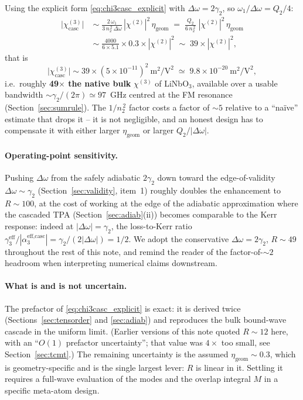 \documentclass[11pt,a4paper]{article}
\newcommand{\chitwo}{\chi^{(2)}}
\newcommand{\chithree}{\chi^{(3)}}
\newcommand{\Dom}{\Delta\omega}
\begin{document}
Using the explicit form \eqref{eq:chi3casc_explicit} with $\Dom=2\gamma_2$,
so $\omega_1/\Dom = Q_2/4$:
\begin{align*}
  \bigl|\chithree_\text{casc}\bigr|\;&\sim\;
        \frac{2\,\omega_1}{3\,n_2^{\,2}\,\Dom}\,|\chitwo|^{2}\,\eta_\text{geom}
   \;=\;\frac{Q_2}{6\,n_2^{\,2}}\;|\chitwo|^{2}\,\eta_\text{geom}\\[2pt]
   &\sim\;\frac{4000}{6\times 5.1}\times 0.3\times|\chitwo|^{2}
   \;\sim\;39\times|\chitwo|^{2},
\end{align*}
that is
\begin{equation*}
  \bigl|\chithree_\text{casc}\bigr|\sim
       39\times(5\times10^{-11})^{2}\ \mathrm{m^{2}/V^{2}}
       \;\simeq\;9.8\times10^{-20}\ \mathrm{m^{2}/V^{2}},
\end{equation*}
i.e.\ roughly \textbf{49$\boldsymbol{\times}$ the native bulk}
$\chithree$ of LiNbO$_3$, available over a usable bandwidth
$\sim\gamma_2/(2\pi)\simeq 97$~GHz centred at the FM resonance
(Section~\ref{sec:sumrule}).  The $1/n_2^{\,2}$ factor costs a factor
of $\sim 5$ relative to a ``naïve'' estimate that drops it -- it is
not negligible, and an honest design has to compensate it with either
larger $\eta_\text{geom}$ or larger $Q_2/|\Dom|$.

\paragraph{Operating-point sensitivity.}
Pushing $\Dom$ from the safely adiabatic $2\gamma_2$ down toward the
edge-of-validity $\Dom\!\sim\!\gamma_2$ (Section~\ref{sec:validity},
item~1) roughly doubles the enhancement to $R\!\sim\!100$, at the
cost of working at the edge of the adiabatic approximation where the
cascaded TPA (Section~\ref{sec:adiab}(ii)) becomes comparable to the
Kerr response: indeed at $|\Dom|=\gamma_2$, the loss-to-Kerr ratio
$\gamma_3^\text{eff}/|\alpha_3^\text{eff,casc}|=\gamma_2/(2|\Dom|)=1/2$.
We adopt
the conservative $\Dom=2\gamma_2$, $R\!\sim\!49$ throughout the rest of
this note, and remind the reader of the factor-of-$\sim\!2$ headroom
when interpreting numerical claims downstream.

\paragraph{What is and is not uncertain.}  The prefactor of
\eqref{eq:chi3casc_explicit} is exact: it is derived twice
(Sections~\ref{sec:tensorder} and \ref{sec:adiab}) and reproduces the
bulk bound-wave cascade in the uniform limit.  (Earlier versions of this
note quoted $R\!\sim\!12$ here, with an ``$O(1)$ prefactor
uncertainty''; that value was $4\times$ too small, see
Section~\ref{sec:tcmt}.)  The remaining uncertainty is the assumed
$\eta_\text{geom}\!\sim\!0.3$, which is geometry-specific and is the
single largest lever: $R$ is linear in it.  Settling it requires a
full-wave evaluation of the modes and the overlap integral $M$ in a
specific meta-atom design.
\end{document}
